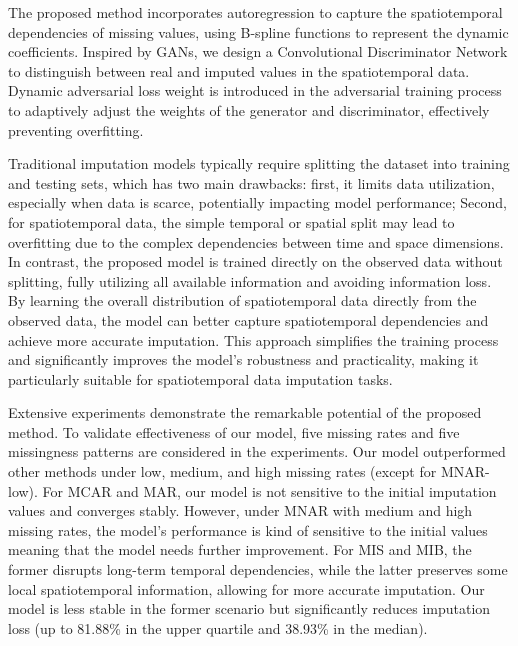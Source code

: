 \documentclass[3p,11pt,authoryear]{elsarticle}
\begin{document}
The proposed method incorporates autoregression to capture the spatiotemporal dependencies of missing values, using B-spline functions to represent the dynamic coefficients. Inspired by GANs, we design a Convolutional Discriminator Network to distinguish between real and imputed values in the spatiotemporal data. Dynamic adversarial loss weight is introduced in the adversarial training process to adaptively adjust the weights of the generator and discriminator, effectively preventing overfitting. 

Traditional imputation models typically require splitting the dataset into training and testing sets, which has two main drawbacks: first, it limits data utilization, especially when data is scarce, potentially impacting model performance; Second, for spatiotemporal data, the simple temporal or spatial split may lead to overfitting due to the complex dependencies between time and space dimensions. In contrast, the proposed model is trained directly on the observed data without splitting, fully utilizing all available information and avoiding information loss. By learning the overall distribution of spatiotemporal data directly from the observed data, the model can better capture spatiotemporal dependencies and achieve more accurate imputation. This approach simplifies the training process and significantly improves the model's robustness and practicality, making it particularly suitable for spatiotemporal data imputation tasks. 

Extensive experiments demonstrate the remarkable potential of the proposed method. To validate effectiveness of our model,  five missing rates and five missingness patterns are considered in the experiments. Our model outperformed other methods under low, medium, and high missing rates (except for MNAR-low). For MCAR and MAR, our model is not sensitive to the initial imputation values and converges stably. However, under MNAR with medium and high missing rates, the model's performance is kind of sensitive to the initial values meaning that the model needs further improvement. For MIS and MIB, the former disrupts long-term temporal dependencies, while the latter preserves some local spatiotemporal information, allowing for more accurate imputation. Our model is less stable in the former scenario but significantly reduces imputation loss (up to 81.88\% in the upper quartile and 38.93\% in the median).
\end{document}
